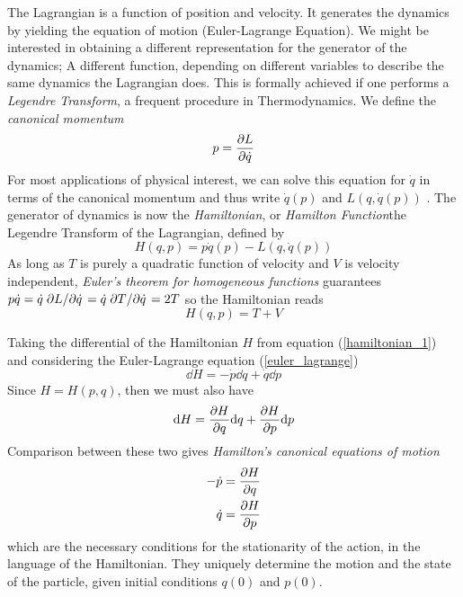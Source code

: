 The Lagrangian is a function of position and velocity. It generates the dynamics by yielding the equation of motion (Euler-Lagrange Equation). We might be interested in obtaining a different representation for the generator of the dynamics; A different function, depending on different variables to describe the same dynamics the Lagrangian does. This is formally achieved if one performs a \textit{Legendre Transform}, a frequent procedure in Thermodynamics. We define the \textit{canonical momentum} \begin{equation}
    p=\pdv{L}{\Dot{q}}
    \label{canonical_p}
\end{equation}
For most applications of physical interest, we can solve  this equation for $\dot{q}$ in terms of the canonical momentum and thus write $\Dot{q}(p)$ and $L(q,\Dot{q}(p))$ \cite{lemos2018analytical}. The generator of dynamics is now the \textit{Hamiltonian}, or \textit{Hamilton Function}\textemdash the Legendre Transform of the Lagrangian, defined by
\begin{equation}
    H(q,p)=p\Dot{q}(p)-L(q,\dot{q}(p))
    \label{hamiltonian_1}
\end{equation}
As long as $T$ is purely a quadratic function of velocity and $V$ is velocity independent, \textit{Euler's theorem for homogeneous functions} guarantees $p\dot{q}=\dot{q}\pdv*{L}{\dot{q}}=\dot{q}\pdv*{T}{\dot{q}}=2T$ so the Hamiltonian reads
\begin{equation}
    H(q,p)=T+V
    \label{hamiltonian_2}
\end{equation}

Taking the differential of the Hamiltonian $H$ from equation (\ref{hamiltonian_1}) and considering the Euler-Lagrange equation (\ref{euler_lagrange})
\begin{equation}
    \dd H=-\dot{p}\dd q+\dot{q}\dd p
\end{equation}
Since $H=H(p,q)$, then we must also have
\begin{equation}
    \dd H = \pdv{H}{q}\dd q + \pdv{H}{p}\dd p
\end{equation} 
Comparison between these two gives \textit{Hamilton's canonical equations of motion}
\begin{equation}
    \begin{aligned}
        -\dot{p}&=\pdv{H}{q}\\
        \dot{q}&=\pdv{H}{p} 
    \end{aligned}
    \label{hamiltons_eq}
\end{equation}
which are the necessary conditions for the stationarity of the action, in the language of the Hamiltonian. They uniquely determine the motion and the state of the particle, given initial conditions $q(0)$ and $p(0)$.\\

